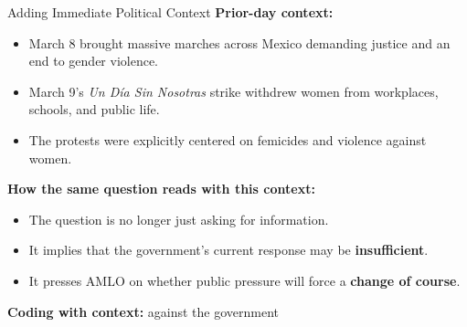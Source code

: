 \documentclass[10pt,aspectratio=169]{beamer}
\begin{document}
\begin{frame}{Adding Immediate Political Context}
\small
\textbf{Prior-day context:}

\begin{itemize}
    \item March 8 brought massive marches across Mexico demanding justice and an end to gender violence.
    \item March 9's \emph{Un Día Sin Nosotras} strike withdrew women from workplaces, schools, and public life.
    \item The protests were explicitly centered on femicides and violence against women.
\end{itemize}

\vspace{0.3cm}

\textbf{How the same question reads with this context:}

\begin{itemize}
    \item The question is no longer just asking for information.
    \item It implies that the government's current response may be \textbf{insufficient}.
    \item It presses AMLO on whether public pressure will force a \textbf{change of course}.
\end{itemize}

\vspace{0.2cm}

\textbf{Coding with context:} \alert{against the government}
\end{frame}
\end{document}
